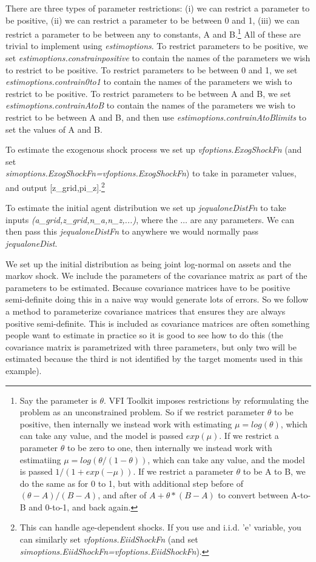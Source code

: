 There are three types of parameter restrictions: (i) we can restrict a parameter to be positive, (ii) we can restrict a parameter to be between 0 and 1, (iii) we can restrict a parameter to be between any to constants, A and B.\footnote{Say the parameter is $\theta$. VFI Toolkit imposes restrictions by reformulating the problem as an unconstrained problem. So if we restrict parameter $\theta$ to be positive, then internally we instead work with estimating $\mu=log(\theta)$, which can take any value, and the model is passed $exp(\mu)$. If we restrict a parameter $\theta$ to be zero to one, then internally we instead work with estimatiing $\mu=log(\theta/(1-\theta))$, which can take any value, and the model is passed $1/(1+exp(-\mu))$. If we restrict a parameter $\theta$ to be A to B, we do the same as for 0 to 1, but with additional step before of $(\theta-A)/(B-A)$, and after of $A+\theta*(B-A)$ to convert between A-to-B and 0-to-1, and back again.} All of these are trivial to implement using \textit{estimoptions}. To restrict parameters to be positive, we set \textit{estimoptions.constrainpositive} to contain the names of the parameters we wish to restrict to be positive. To restrict parameters to be between 0 and 1, we set \textit{estimoptions.contrain0to1} to contain the names of the parameters we wish to restrict to be positive. To restrict parameters to be between A and B, we set \textit{estimoptions.contrainAtoB} to contain the names of the parameters we wish to restrict to be between A and B, and then use \textit{estimoptions.contrainAtoBlimits} to set the values of A and B.

To estimate the exogenous shock process we set up \textit{vfoptions.ExogShockFn} (and set
\\ \noindent \textit{simoptions.ExogShockFn=vfoptions.ExogShockFn}) to take in parameter values, and output [z\_{}grid,pi\_{}z].\footnote{This can handle age-dependent shocks. If you use and i.i.d. 'e' variable, you can similarly set \textit{vfoptions.EiidShockFn} (and set \textit{simoptions.EiidShockFn=vfoptions.EiidShockFn}).}

To estimate the initial agent distribution we set up \textit{jequaloneDistFn} to take inputs \textit{(a\_{}grid,z\_{}grid,n\_{}a,n\_{}z,...)}, where the $\dots$ are any parameters. We can then pass this \textit{jequaloneDistFn} to anywhere we would normally pass \textit{jequaloneDist}.

We set up the initial distribution as being joint log-normal on assets and the markov shock. We include the parameters of the covariance matrix as part of the parameters to be estimated. Because covariance matrices have to be positive semi-definite doing this in a naive way would generate lots of errors. So we follow a method to parameterize covariance matrices that ensures they are always positive semi-definite. This is included as covariance matrices are often something people want to estimate in practice so it is good to see how to do this (the covariance matrix is parametrized with three parameters, but only two will be estimated because the third is not identified by the target moments used in this example).

